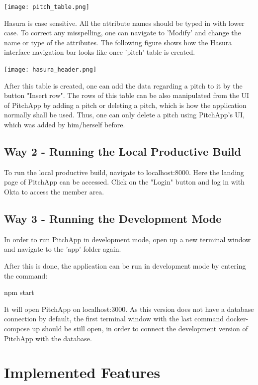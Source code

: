 \begin{center}
	\texttt{[image: pitch\_table.png]}
\end{center}

Hasura is case sensitive. All the attribute names should be typed in with lower case.
To correct any misspelling, one can navigate to 'Modify' and change the name or type of the attributes.
The following figure shows how the Hasura interface navigation bar looks like once 'pitch' table is created.

\begin{center}
	\texttt{[image: hasura\_header.png]}
\end{center}

After this table is created, one can add the data regarding a pitch to it by the button "Insert row". The rows of this table can be also manipulated from the UI of PitchApp by adding a pitch or deleting a pitch, which is how the application normally shall be used. Thus, one can only delete a pitch using PitchApp's UI, which was added by him/herself before.

\subsection{Way 2 - Running the Local Productive Build}

To run the local productive build, navigate to localhost:8000. Here the landing page of PitchApp can be accessed. Click on the "Login" button and log in with Okta to access the member area.

\subsection{Way 3 - Running the Development Mode}

In order to run PitchApp in development mode, open up a new terminal window and navigate to the 'app' folder again.

After this is done, the application can be run in development mode by entering the command:

npm start

It will open PitchApp on localhost:3000. As this version does not have a database connection by default, the first terminal window with the last command docker-compose up should be still open, in order to connect the development version of PitchApp with the database.

\section{Implemented Features}

